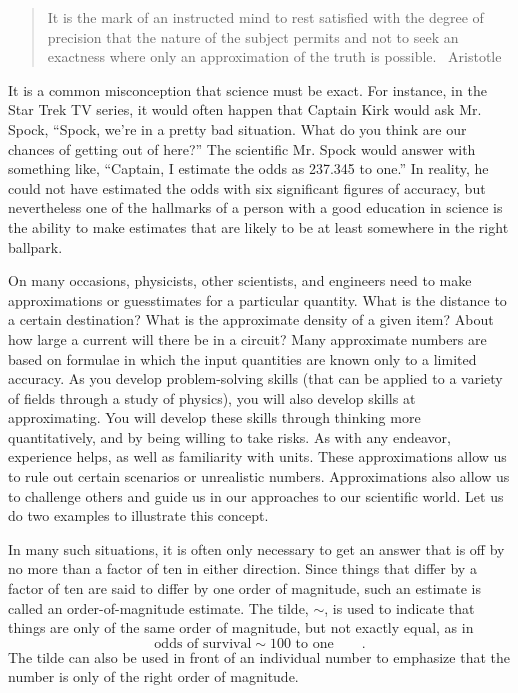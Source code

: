 \begin{quotation}
It is the mark of an instructed mind to rest satisfied with
the degree of precision that the nature of the subject
permits and not to seek an exactness where only an
approximation of the truth is possible. ~Aristotle
\end{quotation}

It is a common misconception that science must be exact. For
instance, in the Star Trek TV series, it would often happen
that Captain Kirk would ask Mr. Spock, ``Spock, we're in a
pretty bad situation. What do you think are our chances of
getting out of here?'' The scientific Mr. Spock would answer
with something like, ``Captain, I estimate the odds as
237.345 to one.'' In reality, he could not have estimated
the odds with six significant figures of accuracy, but
nevertheless one of the hallmarks of a person with a good
education in science is the ability to make estimates that
are likely to be at least somewhere in the right ballpark.

On many occasions, physicists, other scientists, and engineers need to make approximations or guesstimates for a particular quantity. What is the distance to a certain destination? What is the approximate density of a given item? About how large a current will there be in a circuit? Many approximate numbers are based on formulae in which the input quantities are known only to a limited accuracy. As you develop problem-solving skills (that can be applied to a variety of fields through a study of physics), you will also develop skills at approximating. You will develop these skills through thinking more quantitatively, and by being willing to take risks. As with any endeavor, experience helps, as well as familiarity with units. These approximations allow us to rule out certain scenarios or unrealistic numbers. Approximations also allow us to challenge others and guide us in our approaches to our scientific world. Let us do two examples to illustrate this concept.

In many such situations, it is often only necessary to get
an answer that is off by no more than a factor of ten in
either direction. Since things that differ by a factor of
ten are said to differ by one order of magnitude, such an
estimate is called an order-of-magnitude estimate. The
tilde, $\sim$, is used to indicate that things are only of
the same order of magnitude, but not exactly equal, as in
\begin{equation*}
 \text{odds of survival} \sim \text{100 to one} \qquad .
\end{equation*}
The tilde can also be used in front of an individual number
to emphasize that the number is only of the right order of magnitude.

